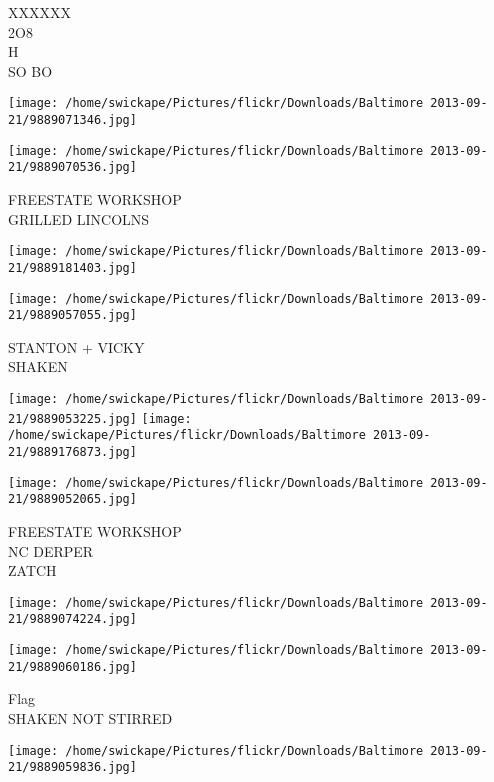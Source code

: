 \documentclass[10pt,letterpaper]{article}
\begin{document}
XXXXXX\\
2O8\\
H\\
SO BO\\
\pagebreak

\texttt{[image: /home/swickape/Pictures/flickr/Downloads/Baltimore 2013-09-21/9889071346.jpg]}

\vspace{0.25in}
\texttt{[image: /home/swickape/Pictures/flickr/Downloads/Baltimore 2013-09-21/9889070536.jpg]}

FREESTATE WORKSHOP\\
GRILLED LINCOLNS\\
\pagebreak

\texttt{[image: /home/swickape/Pictures/flickr/Downloads/Baltimore 2013-09-21/9889181403.jpg]}

\vspace{0.25in}
\texttt{[image: /home/swickape/Pictures/flickr/Downloads/Baltimore 2013-09-21/9889057055.jpg]}

STANTON + VICKY\\
SHAKEN\\
\pagebreak

\texttt{[image: /home/swickape/Pictures/flickr/Downloads/Baltimore 2013-09-21/9889053225.jpg]}
\texttt{[image: /home/swickape/Pictures/flickr/Downloads/Baltimore 2013-09-21/9889176873.jpg]}

\texttt{[image: /home/swickape/Pictures/flickr/Downloads/Baltimore 2013-09-21/9889052065.jpg]}

FREESTATE WORKSHOP\\
NC DERPER\\
ZATCH\\
\pagebreak

\texttt{[image: /home/swickape/Pictures/flickr/Downloads/Baltimore 2013-09-21/9889074224.jpg]}

\vspace{0.25in}
\texttt{[image: /home/swickape/Pictures/flickr/Downloads/Baltimore 2013-09-21/9889060186.jpg]}

Flag\\
SHAKEN NOT STIRRED\\
\pagebreak

\texttt{[image: /home/swickape/Pictures/flickr/Downloads/Baltimore 2013-09-21/9889059836.jpg]}
\end{document}
